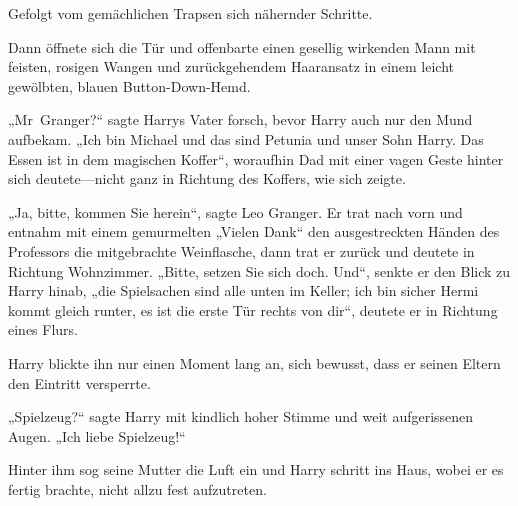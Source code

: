 Gefolgt vom gemächlichen Trapsen sich nähernder Schritte.

Dann öffnete sich die Tür und offenbarte einen gesellig wirkenden Mann mit feisten, rosigen Wangen und zurückgehendem Haaransatz in einem leicht gewölbten, blauen Button-Down-Hemd.

„Mr~Granger?“ sagte Harrys Vater forsch, bevor Harry auch nur den Mund aufbekam.
„Ich bin Michael und das sind Petunia und unser Sohn Harry. Das Essen ist in dem magischen Koffer“, woraufhin Dad mit einer vagen Geste hinter sich deutete—nicht ganz in Richtung des Koffers, wie sich zeigte.

„Ja, bitte, kommen Sie herein“, sagte Leo Granger. Er trat nach vorn und entnahm mit einem gemurmelten
„Vielen Dank“ den ausgestreckten Händen des Professors die mitgebrachte Weinflasche, dann trat er zurück und deutete in Richtung Wohnzimmer.
„Bitte, setzen Sie sich doch. Und“, senkte er den Blick zu Harry hinab, „die Spielsachen sind alle unten im Keller; ich bin sicher Hermi kommt gleich runter, es ist die erste Tür rechts von dir“, deutete er in Richtung eines Flurs.

Harry blickte ihn nur einen Moment lang an, sich bewusst, dass er seinen Eltern den Eintritt versperrte.

„Spielzeug?“ sagte Harry mit kindlich hoher Stimme und weit aufgerissenen Augen.
„Ich liebe Spielzeug!“

Hinter ihm sog seine Mutter die Luft ein und Harry schritt ins Haus, wobei er es fertig brachte, nicht allzu fest aufzutreten.

